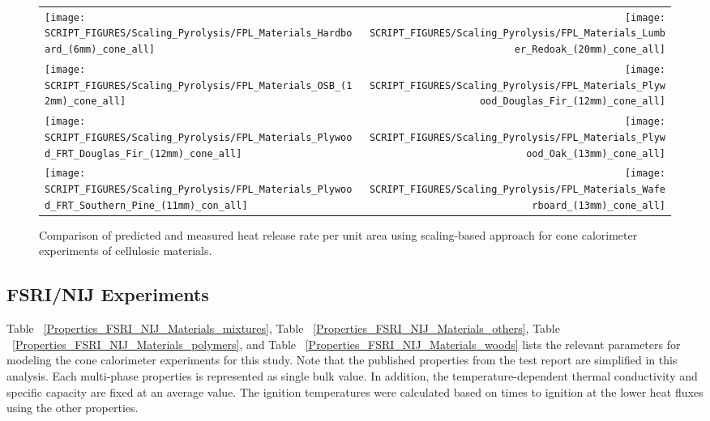 \begin{figure}[p]
\begin{tabular*}{\textwidth}{l@{\extracolsep{\fill}}r}
\texttt{[image: SCRIPT\_FIGURES/Scaling\_Pyrolysis/FPL\_Materials\_Hardboard\_(6mm)\_cone\_all]} &
\texttt{[image: SCRIPT\_FIGURES/Scaling\_Pyrolysis/FPL\_Materials\_Lumber\_Redoak\_(20mm)\_cone\_all]} \\
\texttt{[image: SCRIPT\_FIGURES/Scaling\_Pyrolysis/FPL\_Materials\_OSB\_(12mm)\_cone\_all]} &
\texttt{[image: SCRIPT\_FIGURES/Scaling\_Pyrolysis/FPL\_Materials\_Plywood\_Douglas\_Fir\_(12mm)\_cone\_all]} \\
\texttt{[image: SCRIPT\_FIGURES/Scaling\_Pyrolysis/FPL\_Materials\_Plywood\_FRT\_Douglas\_Fir\_(12mm)\_cone\_all]} &
\texttt{[image: SCRIPT\_FIGURES/Scaling\_Pyrolysis/FPL\_Materials\_Plywood\_Oak\_(13mm)\_cone\_all]} \\
\texttt{[image: SCRIPT\_FIGURES/Scaling\_Pyrolysis/FPL\_Materials\_Plywood\_FRT\_Southern\_Pine\_(11mm)\_con\_all]} &
\texttt{[image: SCRIPT\_FIGURES/Scaling\_Pyrolysis/FPL\_Materials\_Waferboard\_(13mm)\_cone\_all]} \\
\end{tabular*}
\caption[Heat release rate per unit area of FPL materials using scaling model]
{Comparison of predicted and measured heat release rate per unit area using scaling-based approach for cone calorimeter experiments of cellulosic materials.}
\label{FPL_Wood_HRR_woods}
\end{figure}


\clearpage





\subsection{FSRI/NIJ Experiments}\label{sec_FSRI_NIJ_Materials}

Table ~\ref{Properties_FSRI_NIJ_Materials_mixtures}, Table ~\ref{Properties_FSRI_NIJ_Materials_others}, Table ~\ref{Properties_FSRI_NIJ_Materials_polymers}, and Table ~\ref{Properties_FSRI_NIJ_Materials_woods} lists the relevant parameters for modeling the cone calorimeter experiments for this study.
Note that the published properties from the test report are simplified in this analysis. Each multi-phase properties is represented as single bulk value. 
In addition, the temperature-dependent thermal conductivity and specific capacity are fixed at an average value. 
The ignition temperatures were calculated based on times to ignition at the lower heat fluxes using the other properties.


